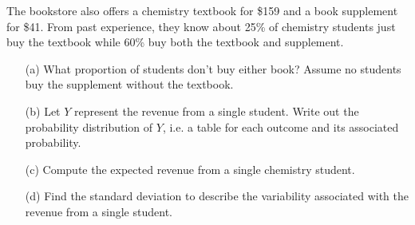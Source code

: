 \begin{exercisewrap}
\begin{nexercise}
The bookstore also offers a chemistry textbook for \$159 and a book supplement for \$41. From past experience, they know about 25\% of chemistry students just buy the textbook while 60\% buy both the textbook and supplement.\footnotemark
\begin{enumerate}
\item[(a)] What proportion of students don't buy either book? Assume no students buy the supplement without the textbook.
\item[(b)] Let $Y$ represent the revenue from a single student. Write out the probability distribution of $Y$, i.e. a table for each outcome and its associated probability.
\item[(c)] Compute the expected revenue from a single chemistry student.
\item[(d)] Find the standard deviation to describe the variability associated with the revenue from a single student.
\end{enumerate}
\end{nexercise}
\end{exercisewrap}

